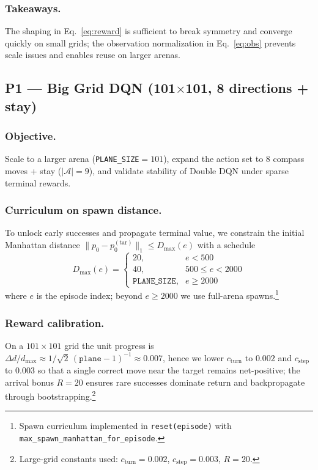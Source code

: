         \subsubsection{Takeaways.}
            The shaping in Eq.~\eqref{eq:reward} is sufficient to break symmetry and converge quickly on small grids; the observation normalization in Eq.~\eqref{eq:obs} prevents scale issues and enables reuse on larger arenas.

    \subsection{P1 — Big Grid DQN (101$\times$101, 8 directions + stay)}
        \subsubsection{Objective.}
            Scale to a larger arena (\texttt{PLANE\_SIZE}$=101$), expand the action set to 8 compass moves + stay ($|\mathcal{A}|=9$), and validate stability of Double DQN under sparse terminal rewards.

        \subsubsection{Curriculum on spawn distance.}
            To unlock early successes and propagate terminal value, we constrain the initial Manhattan distance $\|p_0 - p_0^{(\mathrm{tar})}\|_1 \le D_{\max}(e)$ with a schedule
            \[
            D_{\max}(e)=
            \begin{cases}
            20,& e<500\\
            40,& 500\le e<2000\\
            \texttt{PLANE\_SIZE},& e\ge 2000
            \end{cases}
            \]
            where $e$ is the episode index; beyond $e\!\ge\!2000$ we use full-arena spawns.\footnote{Spawn curriculum implemented in \texttt{reset(episode)} with \texttt{max\_spawn\_manhattan\_for\_episode}.}

        \subsubsection{Reward calibration.}
            On a $101\times 101$ grid the unit progress is $\Delta d/d_{\max}\approx 1/\sqrt{2}\,(\texttt{plane}-1)^{-1}\approx 0.007$, hence we lower $c_{\mathrm{turn}}$ to $0.002$ and $c_{\mathrm{step}}$ to $0.003$ so that a single correct move near the target remains net-positive; the arrival bonus $R{=}20$ ensures rare successes dominate return and backpropagate through bootstrapping.\footnote{Large-grid constants used: $c_{\mathrm{turn}}{=}0.002$, $c_{\mathrm{step}}{=}0.003$, $R{=}20$.}

